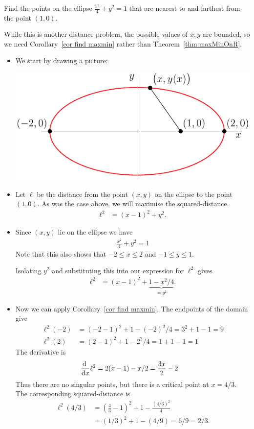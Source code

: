 \begin{eg}\label{APPglobalMaxMinDD}
Find the points on the ellipse $\frac{x^2}{4}+y^2=1$ that are nearest
to and farthest from the point $(1,0)$.


\soln While this is another distance problem, the possible values of $x,y$ are bounded,
so we need Corollary~\ref{cor find maxmin} rather than Theorem~\ref{thm:maxMinOnR}.
\begin{itemize}
 \item We start by drawing a picture:
\begin{efig}
\begin{center}
   \includegraphics{ellipseMaxMin}
\end{center}
\end{efig}
\item Let $\ell$ be the distance from the point $(x,y)$ on the ellipse to the point
$(1,0)$. As was the case above, we will maximise the squared-distance.
\begin{align*}
  \ell^2 &= (x-1)^2 + y^2.
\end{align*}
\item Since $(x,y)$ lie on the ellipse we have
\begin{align*}
\frac{x^2}{4}+y^2=1
\end{align*}
Note that this also shows that $-2 \leq x \leq 2$ and $-1 \leq y \leq 1$.


Isolating $y^2$ and substituting this into our expression for $\ell^2$ gives
\begin{align*}
  \ell^2 &= (x-1)^2 + \underbrace{1-x^2/4}_{=y^2}.
\end{align*}

\item Now we can apply Corollary~\ref{cor find maxmin}. The endpoints of the domain give
\begin{align*}
  \ell^2(-2) &= (-2-1)^2 + 1 - (-2)^2/4 = 3^2+1-1 = 9\\
  \ell^2(2) &= (2-1)^2 + 1 - 2^2/4 = 1+1-1 = 1
\end{align*}
The derivative is
\begin{align*}
  \diff{}{x} \ell^2 &= 2(x-1) - x/2 = \frac{3x}{2} - 2
\end{align*}
Thus there are no singular points, but there is a critical point at $x = 4/3$. The
corresponding squared-distance is
\begin{align*}
  \ell^2(4/3) &= \left( \frac{4}{3}-1\right)^2 +1 - \frac{(4/3)^2}{4} \\
  &= (1/3)^2 + 1 - (4/9) = 6/9 = 2/3.
\end{align*}


\end{itemize}
\end{eg}
